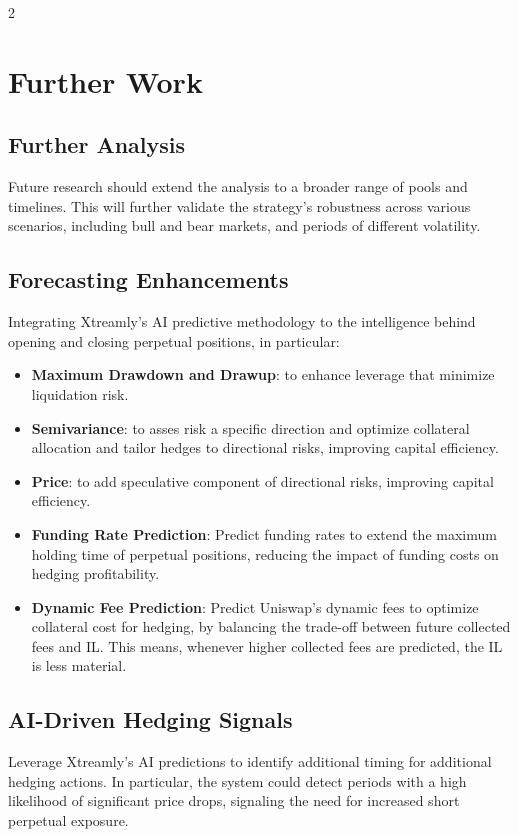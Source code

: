 \documentclass[10pt]{article}
\begin{document}
\begin{multicols}{2}
\section{Further Work}
\label{sec:futurework}

\subsection{Further Analysis}
Future research should extend the analysis to a broader range of pools and timelines. This will further validate the strategy’s robustness across various scenarios, including bull and bear markets, and periods of different volatility.

\subsection{Forecasting Enhancements}
Integrating Xtreamly’s AI predictive methodology to the intelligence behind opening and closing perpetual positions, in particular:
\begin{itemize}
	\item \textbf{Maximum Drawdown and Drawup}: to enhance leverage that minimize liquidation risk. 
	\item \textbf{Semivariance}: to asses risk a specific direction and optimize collateral allocation and tailor hedges to directional risks, improving capital efficiency.
	\item \textbf{Price}: to add speculative component of directional risks, improving capital efficiency.
	\item \textbf{Funding Rate Prediction}: Predict funding rates to extend the maximum holding time of perpetual positions, reducing the impact of funding costs on hedging profitability.
	\item \textbf{Dynamic Fee Prediction}: Predict Uniswap’s dynamic fees to optimize collateral cost for hedging, by balancing the trade-off between future collected fees and IL. This means, whenever higher collected fees are predicted, the IL is less material. 
\end{itemize}

\subsection{AI-Driven Hedging Signals}
Leverage Xtreamly’s AI predictions to identify additional timing for additional hedging actions. In particular, the system could detect periods with a high likelihood of significant price drops, signaling the need for increased short perpetual exposure.


\end{multicols}
\end{document}
